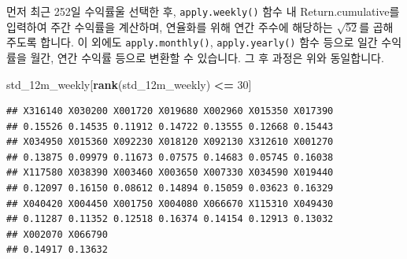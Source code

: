 \documentclass[12pt,]{book}
\newenvironment{Shaded}{\begin{snugshade}}{\end{snugshade}}
\newcommand{\DataTypeTok}[1]{\textcolor[rgb]{0.13,0.29,0.53}{#1}}
\newcommand{\DecValTok}[1]{\textcolor[rgb]{0.00,0.00,0.81}{#1}}
\newcommand{\KeywordTok}[1]{\textcolor[rgb]{0.13,0.29,0.53}{\textbf{#1}}}
\newcommand{\NormalTok}[1]{#1}
\newcommand{\OperatorTok}[1]{\textcolor[rgb]{0.81,0.36,0.00}{\textbf{#1}}}
\newcommand{\StringTok}[1]{\textcolor[rgb]{0.31,0.60,0.02}{#1}}
\begin{document}
먼저 최근 252일 수익률울 선택한 후, \texttt{apply.weekly()} 함수 내 Return.cumulative를 입력하여 주간 수익률을 계산하며, 연율화를 위해 연간 주수에 해당하는 \(\sqrt{52}\)를 곱해주도록 합니다. 이 외에도 \texttt{apply.monthly()}, \texttt{apply.yearly()} 함수 등으로 일간 수익률을 월간, 연간 수익률 등으로 변환할 수 있습니다. 그 후 과정은 위와 동일합니다.

\begin{Shaded}
\begin{Highlighting}[]
\NormalTok{std_12m_weekly[}\KeywordTok{rank}\NormalTok{(std_12m_weekly) }\OperatorTok{<=}\StringTok{ }\DecValTok{30}\NormalTok{]}
\end{Highlighting}
\end{Shaded}

\begin{verbatim}
## X316140 X030200 X001720 X019680 X002960 X015350 X017390 
## 0.15526 0.14535 0.11912 0.14722 0.13555 0.12668 0.15443 
## X034950 X015360 X092230 X018120 X092130 X312610 X001270 
## 0.13875 0.09979 0.11673 0.07575 0.14683 0.05745 0.16038 
## X117580 X038390 X003460 X003650 X007330 X034590 X019440 
## 0.12097 0.16150 0.08612 0.14894 0.15059 0.03623 0.16329 
## X040420 X004450 X001750 X004080 X066670 X115310 X049430 
## 0.11287 0.11352 0.12518 0.16374 0.14154 0.12913 0.13032 
## X002070 X066790 
## 0.14917 0.13632
\end{verbatim}

\begin{Shaded}
\end{Shaded}
\end{document}
